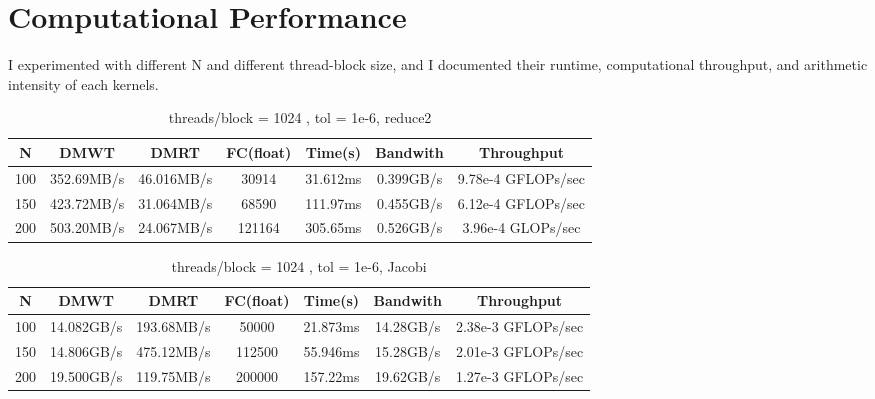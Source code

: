 \documentclass{amsart} %
\begin{document}
\section{Computational Performance}
I experimented with different N and different thread-block size, and I documented their runtime, computational throughput, and arithmetic intensity of each kernels.

\begin{table}[ht]
	\caption{threads/block = 1024 , tol = 1e-6, reduce2} %
	\centering %
	\begin{tabular}{c c c c c c c} %
		\hline\hline %
		N & DMWT & DMRT & FC(float) &Time(s) & Bandwith & Throughput\\ [0.5ex] %
		\hline %
		100 & 352.69MB/s & 46.016MB/s & 30914 & 31.612ms & 0.399GB/s & 9.78e-4 GFLOPs/sec\\ %
		150 & 423.72MB/s & 31.064MB/s & 68590 & 111.97ms & 0.455GB/s & 6.12e-4 GFLOPs/sec\\
		200 & 503.20MB/s & 24.067MB/s & 121164 &305.65ms & 0.526GB/s & 3.96e-4 GLOPs/sec\\[1ex] %
		\hline %
	\end{tabular}
	\label{table:nonlin} %
\end{table}
\FloatBarrier

\begin{table}[ht]
	\caption{threads/block = 1024 , tol = 1e-6, Jacobi} %
	\centering %
	\begin{tabular}{c c c c c c c} %
		\hline\hline %
		N & DMWT & DMRT & FC(float) &Time(s) & Bandwith & Throughput\\ [0.5ex] %
		\hline %
		100 & 14.082GB/s & 193.68MB/s & 50000 & 21.873ms & 14.28GB/s & 2.38e-3 GFLOPs/sec\\ %
		150 & 14.806GB/s & 475.12MB/s & 112500 &55.946ms & 15.28GB/s & 2.01e-3 GFLOPs/sec\\
		200 & 19.500GB/s & 119.75MB/s & 200000 &157.22ms & 19.62GB/s & 1.27e-3 GFLOPs/sec\\[1ex] %
		\hline %
	\end{tabular}
	\label{table:nonlin} %
\end{table}
\FloatBarrier
\end{document}
